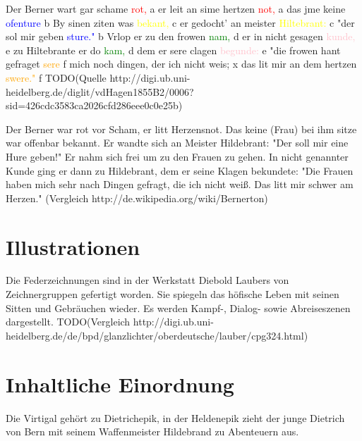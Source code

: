 \documentclass[a4paper, 12pt, oneside]{scrbook}
\begin{document}
Der Berner wart gar schame \textcolor{red}{rot,}			a
er leit an sime hertzen \textcolor{red}{not,}				a
das jme keine \textcolor{blue}{ofenture}					b
By sinen ziten was \textcolor{yellow}{bekant,}				c
er gedocht' an meister \textcolor{yellow}{Hiltebrant:}		c
"der sol mir geben \textcolor{blue}{sture."}				b
Vrlop er zu den frowen \textcolor{green}{nam,}				d
er in nicht gesagen \textcolor{pink}{kunde,}				e
zu Hiltebrante er do \textcolor{green}{kam,}				d
dem er sere clagen \textcolor{pink}{begunde:}				e
"die frowen hant gefraget \textcolor{orange}{sere}			f
mich noch dingen, der ich nicht weis;						x
das lit mir an dem hertzen \textcolor{orange}{swere."}		f
TODO(Quelle http://digi.ub.uni-heidelberg.de/diglit/vdHagen1855B2/0006?sid=426cdc3583ca2026cfd286eee0c0e25b)

Der Berner war rot vor Scham, er litt Herzensnot. Das keine (Frau) bei ihm sitze war offenbar bekannt. Er wandte sich an Meister Hildebrant: "Der soll mir eine Hure geben!" Er nahm sich frei um zu den Frauen zu gehen. In nicht genannter Kunde ging er dann zu Hildebrant, dem er seine Klagen bekundete: "Die Frauen haben mich sehr nach Dingen gefragt, die ich nicht weiß. Das litt mir schwer am Herzen."
(Vergleich http://de.wikipedia.org/wiki/Bernerton)

\section{Illustrationen}
Die Federzeichnungen sind in der Werkstatt Diebold Laubers von Zeichnergruppen gefertigt worden. Sie spiegeln das höfische Leben mit seinen Sitten und Gebräuchen wieder. Es werden Kampf-, Dialog- sowie Abreiseszenen dargestellt.
TODO(Vergleich http://digi.ub.uni-heidelberg.de/de/bpd/glanzlichter/oberdeutsche/lauber/cpg324.html)

\section{Inhaltliche Einordnung}
Die Virtigal gehört zu Dietrichepik, in der Heldenepik zieht der junge Dietrich von Bern mit seinem Waffenmeister Hildebrand zu Abenteuern aus. 
\end{document}
